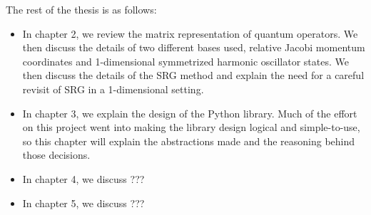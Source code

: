 The rest of the thesis is as follows:
\begin{itemize}
    \item{In chapter 2, we review the matrix representation of quantum operators. We then discuss the details of two different bases used, relative Jacobi momentum coordinates and 1-dimensional symmetrized harmonic oscillator states. We then discuss the details of the SRG method and explain the need for a careful revisit of SRG in a 1-dimensional setting.}
    \item{In chapter 3, we explain the design of the Python library. Much of the effort on this project went into making the library design logical and simple-to-use, so this chapter will explain the abstractions made and the reasoning behind those decisions.}
    \item{In chapter 4, we discuss ???}
    \item{In chapter 5, we discuss ???}
\end{itemize}

